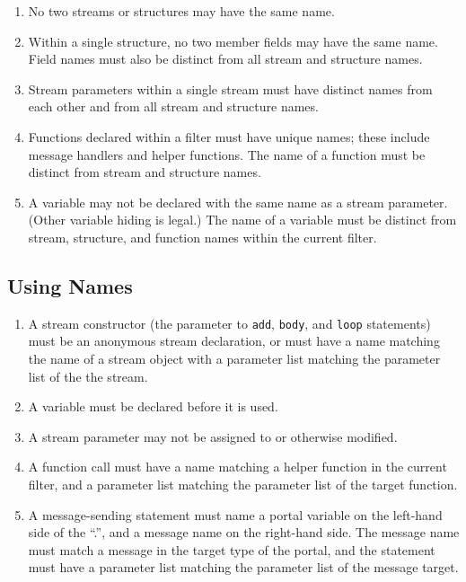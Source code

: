 \documentclass[11pt]{article}
\begin{document}
\begin{enumerate}
\item No two streams or structures may have the same name.
\item Within a single structure, no two member fields may have the
  same name.  Field names must also be distinct from all stream and
  structure names.
\item Stream parameters within a single stream must have distinct
  names from each other and from all stream and structure names.
\item Functions declared within a filter must have unique names; these
  include message handlers and helper functions.  The name of a
  function must be distinct from stream and structure names.
\item A variable may not be declared with the same name as a stream
  parameter.  (Other variable hiding is legal.)  The name of a
  variable must be distinct from stream, structure, and function
  names within the current filter.
\end{enumerate}

\subsection{Using Names}

\begin{enumerate}
\item A stream constructor (the parameter to \lstinline|add|,
  \lstinline|body|, and \lstinline|loop| statements) must be an
  anonymous stream declaration, or must have a name matching the name
  of a stream object with a parameter list matching the parameter list
  of  the the stream.
\item A variable must be declared before it is used.
\item A stream parameter may not be assigned to or otherwise modified.
\item A function call must have a name matching a helper function in
  the current filter, and a parameter list matching the parameter list
  of the target function.
\item A message-sending statement must name a portal variable on the
  left-hand side of the ``.'', and a message name on the right-hand
  side.  The message name must match a message in the target type of
  the portal, and the statement must have a parameter list matching
  the parameter list of the message target.
\end{enumerate}
\end{document}
